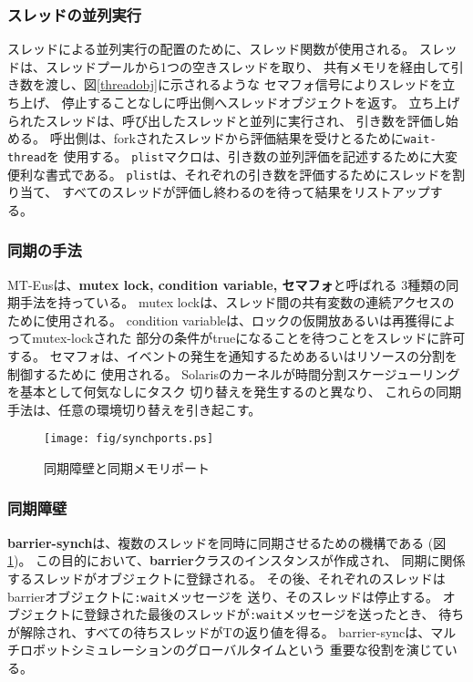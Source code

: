 \subsubsection{スレッドの並列実行}
スレッドによる並列実行の配置のために、スレッド関数が使用される。
スレッドは、スレッドプールから1つの空きスレッドを取り、
共有メモリを経由して引き数を渡し、図\ref{threadobj}に示されるような
セマフォ信号によりスレッドを立ち上げ、
停止することなしに呼出側へスレッドオブジェクトを返す。
立ち上げられたスレッドは、呼び出したスレッドと並列に実行され、
引き数を評価し始める。
呼出側は、forkされたスレッドから評価結果を受けとるために{\tt wait-thread}を
使用する。
{\tt plist}マクロは、引き数の並列評価を記述するために大変便利な書式である。
{\tt plist}は、それぞれの引き数を評価するためにスレッドを割り当て、
すべてのスレッドが評価し終わるのを待って結果をリストアップする。

\subsubsection{同期の手法}
MT-Eusは、{\bf mutex lock, condition variable, セマフォ}と呼ばれる
3種類の同期手法を持っている。
mutex lockは、スレッド間の共有変数の連続アクセスのために使用される。
condition variableは、ロックの仮開放あるいは再獲得によってmutex-lockされた
部分の条件がtrueになることを待つことをスレッドに許可する。
セマフォは、イベントの発生を通知するためあるいはリソースの分割を制御するために
使用される。
Solarisのカーネルが時間分割スケージューリングを基本として何気なしにタスク
切り替えを発生するのと異なり、
これらの同期手法は、任意の環境切り替えを引き起こす。

\begin{figure}
\begin{center}
\texttt{[image: fig/synchports.ps]}
\caption{同期障壁と同期メモリポート}
\label{synchports}
\end{center}
\end{figure}

\subsubsection{同期障壁}
{\bf barrier-synch}は、複数のスレッドを同時に同期させるための機構である
(図 \ref{synchports})。
この目的において、{\bf barrier}クラスのインスタンスが作成され、
同期に関係するスレッドがオブジェクトに登録される。
その後、それぞれのスレッドはbarrierオブジェクトに{\tt :wait}メッセージを
送り、そのスレッドは停止する。
オブジェクトに登録された最後のスレッドが{\tt :wait}メッセージを送ったとき、
待ちが解除され、すべての待ちスレッドがTの返り値を得る。
barrier-syncは、マルチロボットシミュレーションのグローバルタイムという
重要な役割を演じている。

